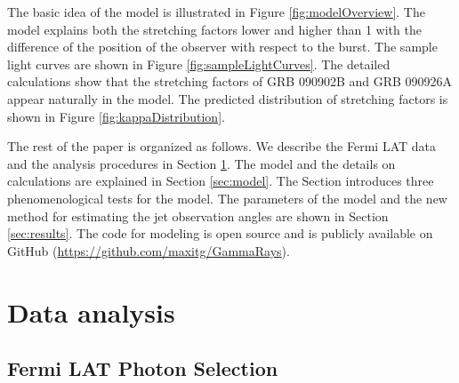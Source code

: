 \documentclass{article}
\begin{document}
The basic idea of the model is illustrated in Figure
\ref{fig:modelOverview}. The model explains both the stretching
factors lower and higher than 1 with the difference of the position of
the observer with respect to the burst. The sample light curves are
shown in Figure \ref{fig:sampleLightCurves}. The detailed calculations
show that the stretching factors of GRB 090902B and GRB 090926A appear
naturally in the model. The predicted distribution of stretching
factors is shown in Figure \ref{fig:kappaDistribution}.

The rest of the paper is organized as follows. We describe the Fermi
LAT data and the analysis procedures in Section
\ref{sec:observations}. The model and the details on calculations are
explained in Section \ref{sec:model}. The Section \label{sec:tests}
introduces three phenomenological tests for the model. The parameters
of the model and the new method for estimating the jet observation
angles are shown in Section \ref{sec:results}. The code for modeling
is open source and is publicly available on GitHub
(\url{https://github.com/maxitg/GammaRays}).

\section{Data analysis}
\label{sec:observations}

\subsection{Fermi LAT Photon Selection}
\label{sec:photonSelection}
\end{document}
